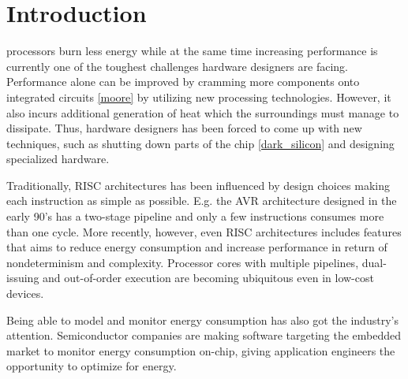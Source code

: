 \section{Introduction}

 processors burn less energy while at the same time
increasing performance is currently one of the toughest challenges hardware
designers are facing. Performance alone can be improved by cramming more
components onto integrated circuits \ref{moore} by utilizing new processing
technologies. However, it also incurs additional generation of heat which the
surroundings must manage to dissipate. Thus, hardware designers has been forced
to come up with new techniques, such as shutting down parts of the chip
\ref{dark_silicon} and designing specialized hardware.

Traditionally, RISC architectures has been influenced by design choices making
each instruction as simple as possible. E.g. the AVR architecture designed in
the early 90's has a two-stage pipeline and only a few instructions consumes
more than one cycle. More recently, however, even RISC architectures includes
features that aims to reduce energy consumption and increase performance in
return of nondeterminism and complexity. Processor cores with multiple
pipelines, dual-issuing and out-of-order execution are becoming ubiquitous even
in low-cost devices.



Being able to model and monitor energy consumption has also got the industry's
attention. Semiconductor companies are making software targeting the embedded
market to monitor energy consumption on-chip, giving application engineers the
opportunity to optimize for energy.




